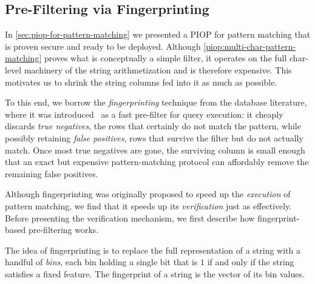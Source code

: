 \subsection{Pre-Filtering via Fingerprinting}
\label{sec:prefilter-fp}

In \cref{sec:piop-for-pattern-matching} we presented a PIOP for pattern matching that is proven secure and ready to be deployed. Although \cref{piop:multi-char-pattern-matching} proves what is conceptually a simple filter, it operates on the full char-level machinery of the string arithmetization and is therefore expensive. This motivates us to shrink the string columns fed into it as much as possible.

To this end, we borrow the \emph{fingerprinting} technique from the database literature, where it was introduced~\cite{string_fingerprint} as a fast pre-filter for query execution: it cheaply discards \emph{true negatives}, the rows that certainly do not match the pattern, while possibly retaining \emph{false positives}, rows that survive the filter but do not actually match. Once most true negatives are gone, the surviving column is small enough that an exact but expensive pattern-matching protocol can affordably remove the remaining false positives.

Although fingerprinting was originally proposed to speed up the \emph{execution} of pattern matching, we find that it speeds up its \emph{verification} just as effectively. Before presenting the verification mechanism, we first describe how fingerprint-based pre-filtering works.

The idea of fingerprinting is to replace the full representation of a string with a handful of \emph{bins}, each bin holding a single bit that is $1$ if and only if the string satisfies a fixed feature. The fingerprint of a string is the vector of its bin values.

